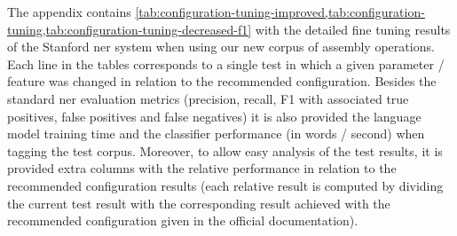 \appendix\label{ap:tuning-tables}

The appendix contains \cref{tab:configuration-tuning-improved,tab:configuration-tuning,tab:configuration-tuning-decreased-f1} with the detailed fine tuning results of the Stanford \gls{ner} system when using our new corpus of assembly operations. Each line in the tables corresponds to a single test in which a given parameter / feature was changed in relation to the recommended configuration. Besides the standard \gls{ner} evaluation metrics (precision, recall, F1 with associated true positives, false positives and false negatives) it is also provided the language model training time and the classifier performance (in words / second) when tagging the test corpus. Moreover, to allow easy analysis of the test results, it is provided extra columns with the relative performance in relation to the recommended configuration results (each relative result is computed by dividing the current test result with the corresponding result achieved with the recommended configuration given in the official documentation).

